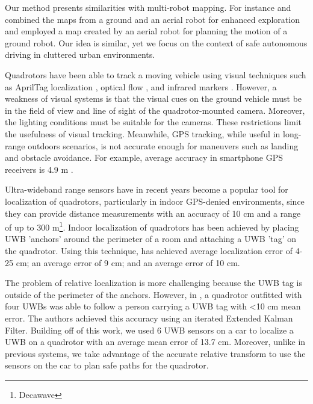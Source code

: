 
Our method presents similarities with multi-robot mapping. For instance \cite{Michael:2012gl} and \cite{Forster:2013kn} combined the maps from a ground and an aerial robot for enhanced exploration and \cite{Delmerico:2017vq} employed a map created by an aerial robot for planning the motion of a ground robot.
Our idea is similar, yet we focus on the context of safe autonomous driving in cluttered urban environments.

Quadrotors have been able to track a moving vehicle using visual techniques
such as AprilTag localization \cite{borowczyk2016autonomous}, optical flow \cite{herisse2012landing},
and infrared markers \cite{wenzel2011automatic}. However, a weakness of visual systems
is that the visual cues on the ground vehicle must be in the field of view and line
of sight of the quadrotor-mounted camera. Moreover, the lighting conditions must be suitable
for the cameras. These restrictions limit the usefulness of visual tracking. Meanwhile,
GPS tracking, while useful in long-range outdoors scenarios, is not accurate enough for 
maneuvers such as landing and obstacle avoidance. For example, average accuracy in
smartphone GPS receivers is 4.9 m \cite{gpsaccuracy}.

Ultra-wideband range sensors have in recent years become a popular tool for
localization of quadrotors, particularly in indoor GPS-denied environments, since they can
provide distance measurements with an accuracy of 10 cm and a range of
up to 300 m\footnote{Decawave}.
Indoor localization of quadrotors has been achieved by placing UWB 'anchors'
around the perimeter of a room and attaching a UWB 'tag' on the quadrotor.
Using this technique, \cite{mueller2015fusing} has achieved average localization error of 4-25 cm;
\cite{kempke2016harmonium} an average error of 9 cm; and \cite{benini2013imu}
an average error of 10 cm.

The problem of relative localization is more challenging because the UWB tag is outside of
the perimeter of the anchors. However, in \cite{tobiuwb}, a quadrotor
outfitted with four UWBs was able to follow a person carrying a UWB tag
with <10 cm mean error. The authors achieved this accuracy using an
iterated Extended Kalman Filter. Building off of this work, we used
6 UWB sensors on a car to localize a UWB on a quadrotor with an
average mean error of 13.7 cm. Moreover, unlike in previous systems,
we take advantage of the accurate relative transform to use the sensors
on the car to plan safe paths for the quadrotor.

